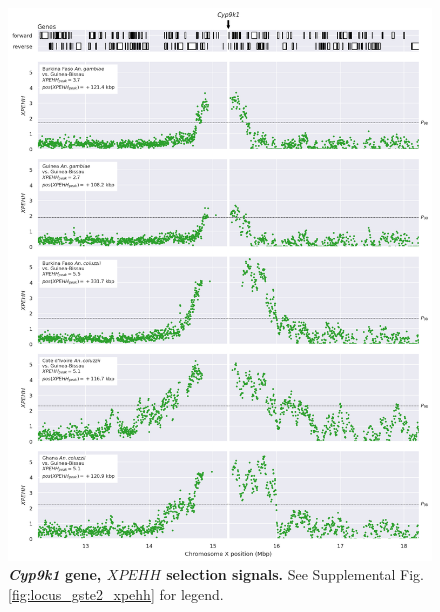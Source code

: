 \documentclass[a4paper,11pt,abstracton,hidelinks]{scrartcl}
\begin{document}
\begin{figure}[t!]
	\begin{center}
		\includegraphics*[width=1\linewidth,center]{artwork/locus_cyp9k1_xpehh_pdist.png}
	\end{center}
	\caption[\textit{Cyp9k1} gene, $XPEHH$ selection signals]{
	\textbf{\textit{Cyp9k1} gene, $XPEHH$ selection signals.}
	See Supplemental Fig. \ref{fig:locus_gste2_xpehh} for legend.
	} 
	\label{fig:locus_cyp9k1_xpehh}
\end{figure}


\clearpage
\end{document}
